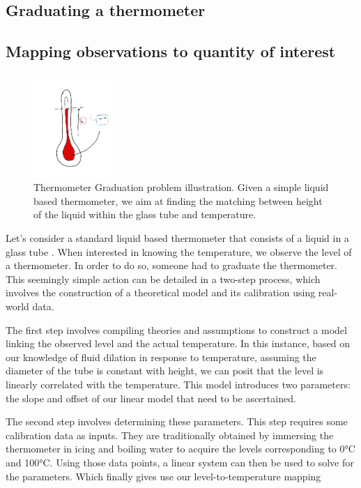\begin{bibunit}
  \section{Graduating a thermometer}
\subsection{Mapping observations to quantity of interest}
\begin{figure}[h]
    \centering
        \includegraphics[clip, width=3cm]{Introduction/pics/therm_pb.png}
    \caption{Thermometer Graduation problem illustration. Given a simple liquid based thermometer, we aim at finding the matching between height of the liquid within the glass tube and temperature.}
    \label{fig:therm_calib}
\end{figure}

Let's consider a standard liquid based thermometer that consists of a liquid in a glass tube .
When interested in knowing the temperature, we observe the level of a thermometer.
In order to do so, someone had to graduate the thermometer. 
This seemingly simple action can be detailed in a two-step process, which involves the construction of a theoretical model and its calibration using real-world data.

The first step involves compiling theories and assumptions to construct a model linking the observed level and the actual temperature.
In this instance, based on our knowledge of fluid dilation in response to temperature, assuming the diameter of the tube is constant with height, we can posit that the level is linearly correlated with the temperature.
This model introduces two parameters: the slope and offset of our linear model that need to be ascertained.

The second step involves determining these parameters. This step requires some calibration data as inputs. They are traditionally obtained by immersing the thermometer in icing and boiling water to acquire the levels corresponding to 0°C and 100°C.
  Using those data points, a linear system can then be used to solve for the parameters. Which finally gives use our level-to-temperature mapping



\end{bibunit}
